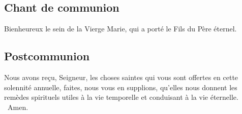 \begin{multicols}{2}
\subsection*{Chant de communion}
Bienheureux le sein de la Vierge Marie, qui a porté le Fils du Père éternel.

\subsection*{Postcommunion}
{Nous avons reçu, Seigneur, les choses saintes qui vous sont offertes en cette solennité annuelle, faites, nous vous en supplions, qu’elles nous donnent les remèdes spirituels utiles à la vie temporelle et conduisant à la vie éternelle.}
{\textbf \rb\ Amen.}

\end{multicols}